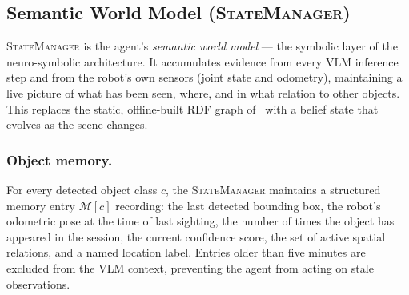 \documentclass[twocolumn,10pt]{article}
\newcommand{\SM}{\textsc{StateManager}}
\begin{document}
\subsection{Semantic World Model (\SM)}
\label{sec:state}

\SM{} is the agent's \textit{semantic world model}
— the symbolic layer of the neuro-symbolic architecture.
It accumulates evidence from every VLM inference step and from the robot's
own sensors (joint state and odometry), maintaining a live picture of
what has been seen, where, and in what relation to other objects.
This replaces the static, offline-built RDF graph of~\cite{eladdachi2025llm}
with a belief state that evolves as the scene changes.

\subsubsection{Object memory.}
For every detected object class $c$, the \SM{} maintains a structured
memory entry $\mathcal{M}[c]$ recording: the last detected bounding box,
the robot's odometric pose at the time of last sighting, the number of
times the object has appeared in the session, the current confidence score,
the set of active spatial relations, and a named location label.
Entries older than five minutes are excluded from the VLM context,
preventing the agent from acting on stale observations.
\end{document}
